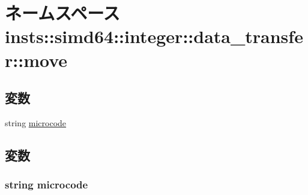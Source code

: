 \hypertarget{namespaceinsts_1_1simd64_1_1integer_1_1data__transfer_1_1move}{
\section{ネームスペース insts::simd64::integer::data\_\-transfer::move}
\label{namespaceinsts_1_1simd64_1_1integer_1_1data__transfer_1_1move}
}
\subsection*{変数}
\begin{DoxyCompactItemize}
\item 
string \hyperlink{namespaceinsts_1_1simd64_1_1integer_1_1data__transfer_1_1move_a770f11a173e99389a8802f0107ed8f52}{microcode}
\end{DoxyCompactItemize}


\subsection{変数}
\hypertarget{namespaceinsts_1_1simd64_1_1integer_1_1data__transfer_1_1move_a770f11a173e99389a8802f0107ed8f52}{
\subsubsection[{microcode}]{\setlength{\rightskip}{0pt plus 5cm}string {\bf microcode}}}
\label{namespaceinsts_1_1simd64_1_1integer_1_1data__transfer_1_1move_a770f11a173e99389a8802f0107ed8f52}
